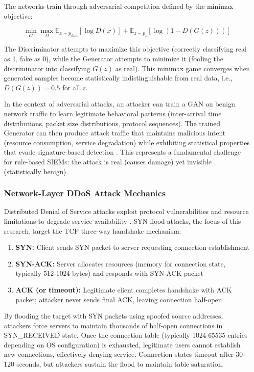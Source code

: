 The networks train through adversarial competition defined by the minimax objective:

\begin{equation}
\min_{G} \max_{D} \mathbb{E}_{x \sim p_{data}}[\log D(x)] + \mathbb{E}_{z \sim p_z}[\log(1 - D(G(z)))]
\end{equation}

The Discriminator attempts to maximize this objective (correctly classifying real as 1, fake as 0), while the Generator attempts to minimize it (fooling the discriminator into classifying $G(z)$ as real). This minimax game converges when generated samples become statistically indistinguishable from real data, i.e., $D(G(z)) = 0.5$ for all $z$.

In the context of adversarial attacks, an attacker can train a GAN on benign network traffic to learn legitimate behavioral patterns (inter-arrival time distributions, packet size distributions, protocol sequences). The trained Generator can then produce attack traffic that maintains malicious intent (resource consumption, service degradation) while exhibiting statistical properties that evade signature-based detection \cite{akana2023, shieh2022dual}. This represents a fundamental challenge for rule-based SIEMs: the attack is real (causes damage) yet invisible (statistically benign).

\subsubsection{Network-Layer DDoS Attack Mechanics}

Distributed Denial of Service attacks exploit protocol vulnerabilities and resource limitations to degrade service availability \cite{goud2024}. SYN flood attacks, the focus of this research, target the TCP three-way handshake mechanism:

\begin{enumerate}
    \item \textbf{SYN:} Client sends SYN packet to server requesting connection establishment
    \item \textbf{SYN-ACK:} Server allocates resources (memory for connection state, typically 512-1024 bytes) and responds with SYN-ACK packet
    \item \textbf{ACK (or timeout):} Legitimate client completes handshake with ACK packet; attacker never sends final ACK, leaving connection half-open
\end{enumerate}

By flooding the target with SYN packets using spoofed source addresses, attackers force servers to maintain thousands of half-open connections in SYN\_RECEIVED state. Once the connection table (typically 1024-65535 entries depending on OS configuration) is exhausted, legitimate users cannot establish new connections, effectively denying service. Connection states timeout after 30-120 seconds, but attackers sustain the flood to maintain table saturation.

